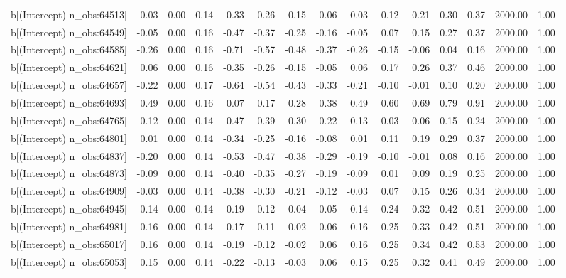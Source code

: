 \begin{table}[ht]
\begin{tabular}{rrrrrrrrrrrrrrr}
  b[(Intercept) n\_obs:64513] & 0.03 & 0.00 & 0.14 & -0.33 & -0.26 & -0.15 & -0.06 & 0.03 & 0.12 & 0.21 & 0.30 & 0.37 & 2000.00 & 1.00 \\ 
  b[(Intercept) n\_obs:64549] & -0.05 & 0.00 & 0.16 & -0.47 & -0.37 & -0.25 & -0.16 & -0.05 & 0.07 & 0.15 & 0.27 & 0.37 & 2000.00 & 1.00 \\ 
  b[(Intercept) n\_obs:64585] & -0.26 & 0.00 & 0.16 & -0.71 & -0.57 & -0.48 & -0.37 & -0.26 & -0.15 & -0.06 & 0.04 & 0.16 & 2000.00 & 1.00 \\ 
  b[(Intercept) n\_obs:64621] & 0.06 & 0.00 & 0.16 & -0.35 & -0.26 & -0.15 & -0.05 & 0.06 & 0.17 & 0.26 & 0.37 & 0.46 & 2000.00 & 1.00 \\ 
  b[(Intercept) n\_obs:64657] & -0.22 & 0.00 & 0.17 & -0.64 & -0.54 & -0.43 & -0.33 & -0.21 & -0.10 & -0.01 & 0.10 & 0.20 & 2000.00 & 1.00 \\ 
  b[(Intercept) n\_obs:64693] & 0.49 & 0.00 & 0.16 & 0.07 & 0.17 & 0.28 & 0.38 & 0.49 & 0.60 & 0.69 & 0.79 & 0.91 & 2000.00 & 1.00 \\ 
  b[(Intercept) n\_obs:64765] & -0.12 & 0.00 & 0.14 & -0.47 & -0.39 & -0.30 & -0.22 & -0.13 & -0.03 & 0.06 & 0.15 & 0.24 & 2000.00 & 1.00 \\ 
  b[(Intercept) n\_obs:64801] & 0.01 & 0.00 & 0.14 & -0.34 & -0.25 & -0.16 & -0.08 & 0.01 & 0.11 & 0.19 & 0.29 & 0.37 & 2000.00 & 1.00 \\ 
  b[(Intercept) n\_obs:64837] & -0.20 & 0.00 & 0.14 & -0.53 & -0.47 & -0.38 & -0.29 & -0.19 & -0.10 & -0.01 & 0.08 & 0.16 & 2000.00 & 1.00 \\ 
  b[(Intercept) n\_obs:64873] & -0.09 & 0.00 & 0.14 & -0.40 & -0.35 & -0.27 & -0.19 & -0.09 & 0.01 & 0.09 & 0.19 & 0.25 & 2000.00 & 1.00 \\ 
  b[(Intercept) n\_obs:64909] & -0.03 & 0.00 & 0.14 & -0.38 & -0.30 & -0.21 & -0.12 & -0.03 & 0.07 & 0.15 & 0.26 & 0.34 & 2000.00 & 1.00 \\ 
  b[(Intercept) n\_obs:64945] & 0.14 & 0.00 & 0.14 & -0.19 & -0.12 & -0.04 & 0.05 & 0.14 & 0.24 & 0.32 & 0.42 & 0.51 & 2000.00 & 1.00 \\ 
  b[(Intercept) n\_obs:64981] & 0.16 & 0.00 & 0.14 & -0.17 & -0.11 & -0.02 & 0.06 & 0.16 & 0.25 & 0.33 & 0.42 & 0.51 & 2000.00 & 1.00 \\ 
  b[(Intercept) n\_obs:65017] & 0.16 & 0.00 & 0.14 & -0.19 & -0.12 & -0.02 & 0.06 & 0.16 & 0.25 & 0.34 & 0.42 & 0.53 & 2000.00 & 1.00 \\ 
  b[(Intercept) n\_obs:65053] & 0.15 & 0.00 & 0.14 & -0.22 & -0.13 & -0.03 & 0.06 & 0.15 & 0.25 & 0.32 & 0.41 & 0.49 & 2000.00 & 1.00 \\ 

\end{tabular}
\end{table}

